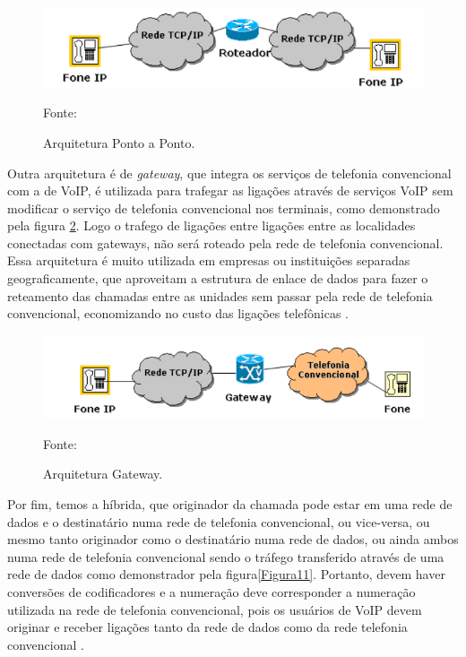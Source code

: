 \begin{figure}[h]
	\centering
	\includegraphics[width=16.0cm]{imagens/pontoaponto.jpg}
	\caption{Arquitetura Ponto a Ponto.}
    \label{Figura9}
    Fonte: \cite{eduardomaronasmonks2006}
\end{figure}

Outra arquitetura é de \textit{gateway}, que integra os serviços de telefonia convencional com a de VoIP, é utilizada para trafegar as ligações através de serviços VoIP sem modificar o serviço de telefonia convencional nos terminais, como demonstrado pela figura \ref{Figura10}. Logo o trafego de ligações entre ligações entre as localidades conectadas com gateways, não será roteado pela rede de telefonia convencional. Essa arquitetura é muito utilizada em empresas ou instituições separadas geograficamente, que aproveitam a estrutura de enlace de dados para fazer o reteamento das chamadas entre as unidades sem passar pela rede de telefonia convencional, economizando no custo das ligações telefônicas \cite{eduardomaronasmonks2006}.

\begin{figure}[h]
	\centering
	\includegraphics[width=16.0cm]{imagens/gateway.jpg}
	\caption{Arquitetura Gateway.}
    \label{Figura10}
    Fonte: \cite{eduardomaronasmonks2006}
\end{figure}

Por fim, temos a híbrida, que originador da chamada pode estar em uma rede de dados e o destinatário numa rede de telefonia convencional, ou vice-versa, ou mesmo tanto originador como o destinatário numa rede de dados, ou ainda ambos numa rede de telefonia convencional sendo o tráfego transferido através de uma rede de dados como demonstrador pela figura\ref{Figura11}. Portanto, devem haver conversões de codificadores e a numeração deve corresponder a numeração utilizada na rede de telefonia convencional, pois os usuários de VoIP devem originar e receber ligações tanto da rede de dados como da rede telefonia convencional \cite{eduardomaronasmonks2006}.

